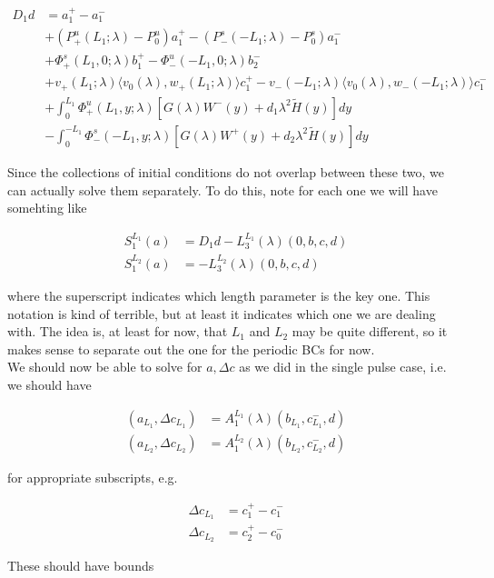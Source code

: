 \documentclass[12pt]{article}
\begin{document}
\begin{enumerate}
\begin{align*}
D_1 d &= a_1^+ - a_1^- \\
&+ (P^u_+(L_1; \lambda) - P_0^u)a_1^+ - (P^s_-(-L_1; \lambda) - P_0^s)a_1^- \\
&+ \Phi^s_+(L_1, 0; \lambda)b_1^+ - \Phi^u_-(-L_1, 0; \lambda)b_2^- \\
&+ v_+(L_1; \lambda) \langle v_0(\lambda), w_+(L_1; \lambda) \rangle c_1^+ - v_-(-L_1; \lambda) \langle v_0(\lambda), w_-(-L_1; \lambda) \rangle c_1^- \\
&+ \int_0^{L_1} \Phi^u_+(L_1, y; \lambda) [ G(\lambda)W^-(y) + d_1 \lambda^2 \tilde{H}(y) ] dy \\
&- \int_0^{-L_1} \Phi^s_-(-L_1, y; \lambda) [ G(\lambda)W^+(y) + d_2 \lambda^2 \tilde{H}(y) ] dy
\end{align*}

Since the collections of initial conditions do not overlap between these two, we can actually solve them separately. To do this, note for each one we will have somehting like

\begin{align*}
S_1^{L_1}(a) &= D_1 d - L_3^{L_1}(\lambda)(0, b, c, d) \\
S_1^{L_2}(a) &= - L_3^{L_2}(\lambda) (0, b, c, d)
\end{align*}

where the superscript indicates which length parameter is the key one. This notation is kind of terrible, but at least it indicates which one we are dealing with. The idea is, at least for now, that $L_1$ and $L_2$ may be quite different, so it makes sense to separate out the one for the periodic BCs for now.\\

We should now be able to solve for $a, \Delta c$ as we did in the single pulse case, i.e. we should have 

\begin{align*}
(a_{L_1}, \Delta c_{L_1}) &= A_1^{L_1}(\lambda)(b_{L_1}, c_{L_1}^-,d) \\
(a_{L_2}, \Delta c_{L_2}) &= A_1^{L_2}(\lambda)(b_{L_2}, c_{L_2}^-,d) 
\end{align*}

for appropriate subscripts, e.g.

\begin{align*}
\Delta c_{L_1} &= c_1^+ - c_1^- \\
\Delta c_{L_2} &= c_2^+ - c_0^-
\end{align*}

 These should have bounds


\end{enumerate}
\end{document}

